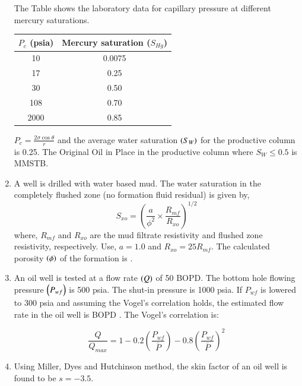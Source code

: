 \documentclass[journal,12pt,onecolumn]{IEEEtran}
\theoremstyle{remark}
\begin{document}
\begin{enumerate}
The Table shows the laboratory data for capillary pressure at different mercury saturations.


\begin{tabular}{|c|c|}
\hline
$P_c$ (psia) & Mercury saturation ($S_{Hg}$) \\
\hline
10 & 0.0075 \\
17 & 0.25 \\
30 & 0.50 \\
108 & 0.70 \\
2000 & 0.85 \\
\hline
\end{tabular}


$P_c = \frac{2\sigma \cos \theta}{r}$ and the average water saturation $\left(S_W\right)$ for the productive column is 0.25. The Original Oil in Place  in the productive column where $S_W \leq 0.5$ is \underline{\hspace{2cm}} MMSTB.  

\hfill{}


\item A well is drilled with water based mud. The water saturation in the completely flushed zone (no formation fluid residual) is given by, 
\[ S_{xo} = \left( \frac{a}{\phi^2} \times \frac{R_{mf}}{R_{xo}} \right)^{1/2} \]
where, $R_{mf}$ and $R_{xo}$ are the mud filtrate resistivity and flushed zone resistivity, respectively. Use, $a = 1.0$ and $R_{xo} = 25 R_{mf}$. 
The calculated porosity $\left(\phi\right)$ of the formation is \underline{\hspace{2cm}}.  

\hfill{}

\item An oil well is tested at a flow rate $\left(Q\right)$ of 50 BOPD. The bottom hole flowing pressure $\left(P_{wf}\right)$ is 500 psia. The shut-in pressure is 1000 psia. If $P_{wf}$ is lowered to 300 psia and assuming the Vogel's correlation holds, the estimated flow rate in the oil well is \underline{\hspace{2cm}} BOPD . The Vogel's correlation is:

\[ \frac{Q}{Q_{max}} = 1 - 0.2\left(\frac{P_{wf}}{\bar{P}}\right) - 0.8\left(\frac{P_{wf}}{\bar{P}}\right)^2 \] \hfill{}
\pagebreak

\item Using Miller, Dyes and Hutchinson  method, the skin factor of an oil well is found to be $s = -3.5$. \\ 


\end{enumerate}
\end{document}
